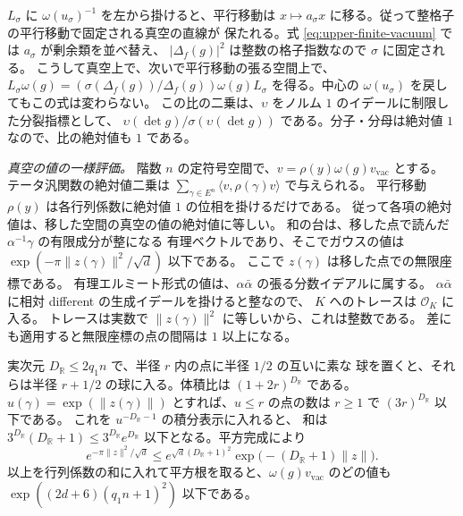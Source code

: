 \(L_\sigma\) に \(\omega(u_\sigma)^{-1}\) を左から掛けると、平行移動は
\(x\mapsto a_\sigma x\) に移る。従って整格子の平行移動で固定される真空の直線が
保たれる。式 \eqref{eq:upper-finite-vacuum} では \(a_\sigma\) が剰余類を並べ替え、
\(|\Delta_f(g)|^2\) は整数の格子指数なので \(\sigma\) に固定される。
こうして真空上で、次いで平行移動の張る空間上で、
\(L_\sigma\omega(g)=(\sigma(\Delta_f(g))/\Delta_f(g))\omega(g)L_\sigma\)
を得る。中心の \(\omega(u_\sigma)\) を戻してもこの式は変わらない。
この比の二乗は、\(\upsilon\) をノルム \(1\) のイデールに制限した分裂指標として、
\(\upsilon(\det g)/\sigma(\upsilon(\det g))\) である。分子・分母は絶対値 \(1\)
なので、比の絶対値も \(1\) である。

\emph{真空の値の一様評価。}
階数 \(n\) の定符号空間で、\(v=\rho(y)\omega(g)v_\mathrm{vac}\) とする。
テータ汎関数の絶対値二乗は
\(\sum_{\gamma\in E^n}\langle v,\rho(\gamma)v\rangle\) で与えられる。
平行移動 \(\rho(y)\) は各行列係数に絶対値 \(1\) の位相を掛けるだけである。
従って各項の絶対値は、移した空間の真空の値の絶対値に等しい。
和の台は、移した点で読んだ \(\alpha^{-1}\gamma\) の有限成分が整になる
有理ベクトルであり、そこでガウスの値は
\(\exp(-\pi\|z(\gamma)\|^2/\sqrt d)\) 以下である。
ここで \(z(\gamma)\) は移した点での無限座標である。
有理エルミート形式の値は、\(\alpha\bar\alpha\) の張る分数イデアルに属する。
\(\alpha\bar\alpha\) に相対 different の生成イデールを掛けると整なので、
\(K\) へのトレースは \(\mathcal O_K\) に入る。
トレースは実数で \(\|z(\gamma)\|^2\) に等しいから、これは整数である。
差にも適用すると無限座標の点の間隔は \(1\) 以上になる。

実次元 \(D_{\mathbb R}\le2q_1n\) で、半径 \(r\) 内の点に半径 \(1/2\) の互いに素な
球を置くと、それらは半径 \(r+1/2\) の球に入る。体積比は \((1+2r)^{D_{\mathbb R}}\)
である。\(u(\gamma)=\exp(\|z(\gamma)\|)\) とすれば、\(u\le r\) の点の数は
\(r\ge1\) で \((3r)^{D_{\mathbb R}}\) 以下である。
これを \(u^{-D_{\mathbb R}-1}\) の積分表示に入れると、
和は \(3^{D_{\mathbb R}}(D_{\mathbb R}+1)\le3^{D_{\mathbb R}}e^{D_{\mathbb R}}\)
以下となる。平方完成により
\[
 e^{-\pi\|z\|^2/\sqrt d}\le
 e^{\sqrt d(D_{\mathbb R}+1)^2}\exp\bigl(-(D_{\mathbb R}+1)\|z\|\bigr).
\]
以上を行列係数の和に入れて平方根を取ると、\(\omega(g)v_\mathrm{vac}\) のどの値も
\(\exp((2d+6)(q_1n+1)^2)\) 以下である。

